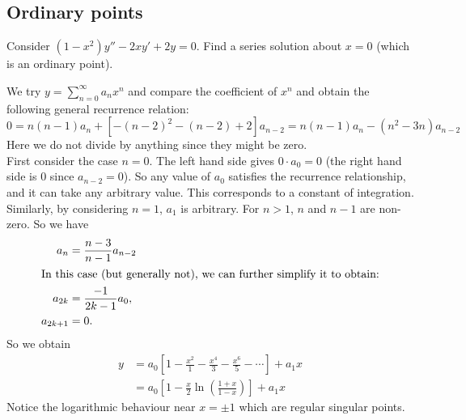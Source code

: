 \documentclass[a4paper]{article}
\begin{document}
\subsection{Ordinary points}
\begin{eg}
  Consider $(1 - x^2)y'' - 2xy' + 2y = 0$. Find a series solution about $x = 0$ (which is an ordinary point).

  We try $y = \sum_{n = 0}^\infty a_nx^n$ and compare the coefficient of $x^n$ and obtain the following general recurrence relation:
  $$0=n(n - 1) a_n + [-(n - 2)^2 - (n - 2) + 2]a_{n - 2}=n(n - 1)a_n- (n^2 - 3n)a_{n - 2}$$
  Here we do not divide by anything since they might be zero.\\[5pt]
  First consider the case $n = 0$. The left hand side gives $0\cdot a_0 = 0$ (the right hand side is $0$ since $a_{n - 2} = 0$). So any value of $a_0$ satisfies the recurrence relationship, and it can take any arbitrary value. This corresponds to a constant of integration. Similarly, by considering $n = 1$, $a_1$ is arbitrary. For $n > 1$, $n$ and $n - 1$ are non-zero. So we have
  \begin{align*}
    a_n &= \frac{n - 3}{n - 1} a_{n - 2}\\
    \intertext{In this case (but generally not), we can further simplify it to obtain:}
    a_{2k} &= \frac{-1}{2k - 1}a_0,\\
    a_{2k + 1} &= 0.
  \end{align*}
  So we obtain
  \begin{align*}
    y &= a_0[1 - \frac{x^2}{1} - \frac{x^4}{3} - \frac{x^6}{5} - \cdots] + a_1 x\\
    &= a_0\left[1 - \frac{x}{2}\ln\left(\frac{1 + x}{1 - x}\right)\right] + a_1x
  \end{align*}
  Notice the logarithmic behaviour near $x = \pm 1$ which are regular singular points.
\end{eg}
\end{document}
